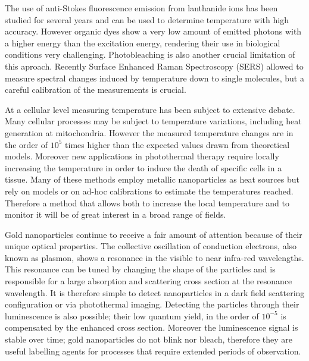 \documentclass[journal=nalefd,manuscript=letter]{achemso}
\begin{document}
The use of anti-Stokes fluorescence emission from lanthanide ions has been
studied for several years\cite{Auzel2004a} and can be used to determine
temperature with high accuracy. However organic dyes show a very low amount of
emitted photons with a higher energy than the excitation energy, rendering their
use in biological conditions very challenging. Photobleaching is also another crucial limitation
of this aproach.
Recently Surface Enhanced Raman
Spectroscopy (SERS) allowed to measure spectral changes induced by temperature
down to single molecules\cite{Pozzi2015}, but a careful calibration of the
measurements is crucial.

At a cellular level measuring temperature has been subject to extensive
debate\cite{Yang2011a,Suzuki2015}. Many cellular processes may be subject to
temperature variations, including heat generation at mitochondria. However the
measured temperature changes\cite{Yang2011a} are in the order of $10^5$ times
higher than the expected values drawn from theoretical models\cite{Sato2014}.
Moreover new applications in photothermal therapy require locally increasing the
temperature in order to induce the death of specific cells in a
tissue\cite{Huang2008,Huang2006}. Many of these methods employ metallic
nanoparticles as heat sources\cite{Gobin2007,Hirsch2003} but rely on
models\cite{Zhao2014a} or on ad-hoc calibrations to estimate the temperatures
reached\cite{Donner2013}. Therefore a method that allows both to increase the
local temperature and to monitor it will be of great interest in a broad range
of fields.

Gold nanoparticles continue to receive a fair amount of attention because of
their unique optical properties\cite{Zijlstra2011}. The collective oscillation
of conduction electrons, also known as plasmon, shows a resonance in the visible to
near infra-red wavelengths. This resonance can be tuned by changing the shape of
the particles\cite{Carattino2016} and is responsible for a large absorption
and scattering cross section at the resonance wavelength. It is therefore simple
to detect nanoparticles in a dark field scattering\cite{Hu2008} configuration or
via photothermal imaging\cite{Berciaud2006}. Detecting the particles through
their luminescence\cite{Tcherniak2011} is also possible; their low quantum
yield\cite{Fang2012,Rao2015,Yorulmaz2012,Cheng2015}, in the order of $10^{-5}$
is compensated by the enhanced cross section. Moreover the luminescence signal
is stable over time; gold nanoparticles do not blink nor bleach, therefore
they are useful labelling agents for processes that require extended periods of
observation\cite{Wang2005}.
\end{document}
